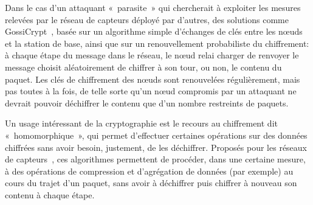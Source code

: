Dans le cas d'un attaquant « parasite » qui chercherait à exploiter les mesures relevées par le réseau de capteurs déployé par d'autres, des solutions comme GossiCrypt~\cite{LPH08}, basée sur un algorithme simple d'échanges de clés entre les nœuds et la station de base, ainsi que sur un renouvellement probabiliste du chiffrement: à chaque étape du message dans le réseau, le nœud relai charger de renvoyer le message choisit aléatoirement de chiffrer à son tour, ou non, le contenu du paquet.
Les clés de chiffrement des nœuds sont renouvelées régulièrement, mais pas toutes à la fois, de telle sorte qu'un nœud compromis par un attaquant ne devrait pouvoir déchiffrer le contenu que d'un nombre restreints de paquets.

Un usage intéressant de la cryptographie est le recours au chiffrement dit « homomorphique », qui permet d'effectuer certaines opérations sur des données chiffrées sans avoir besoin, justement, de les déchiffrer.
Proposés pour les réseaux de capteurs~\cite{BBTY14}, ces algorithmes permettent de procéder, dans une certaine mesure, à des opérations de compression et d'agrégation de données (par exemple) au cours du trajet d'un paquet, sans avoir à déchiffrer puis chiffrer à nouveau son contenu à chaque étape.

